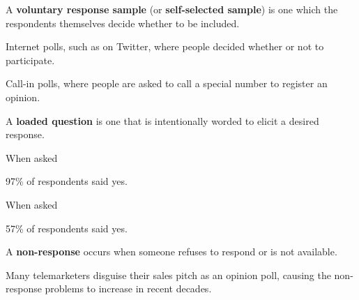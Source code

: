 \documentclass{beamer}
\begin{document}
\begin{frame}
\begin{definition}
A \textbf{voluntary response sample} (or \textbf{self-selected sample}) is one which the respondents themselves decide whether to be included.\end{definition}\pause

\begin{example}
Internet polls, such as on Twitter, where people decided whether or not to participate.
\end{example}\pause

\begin{example}
Call-in polls, where people are asked to call a special number to register an opinion.
\end{example}
\end{frame}

\begin{frame}
\begin{definition}
A \textbf{loaded question} is one that is intentionally worded to elicit a desired response.
\end{definition}\pause

\begin{example}
When asked \blockquote{} 97\% of respondents said yes.
\end{example}\pause

\begin{example}
When asked \blockquote{} 57\% of respondents said yes.
\end{example}
\end{frame}

\begin{frame}
\begin{definition}
A \textbf{non-response} occurs when someone refuses to respond or is not available.
\end{definition}\pause

\begin{example}
Many telemarketers disguise their sales pitch as an opinion poll, causing the non-response problems to increase in recent decades.
\end{example}\pause

\begin{example}

\end{example}
\end{frame}
\end{document}
